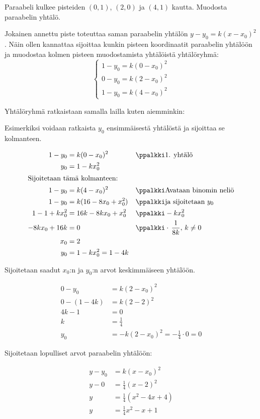 \begin{esimerkki}
	Paraabeli kulkee pisteiden $(0,1)$, $(2,0)$ ja $(4,1)$ kautta. Muodosta paraabelin yhtälö.
	
	\begin{esimratk} 
		Jokainen annettu piste toteuttaa saman paraabelin yhtälön $y - y_0 = k(x-x_0)^2$. Näin ollen kannattaa sijoittaa kunkin pisteen koordinaatit paraabelin yhtälöön ja muodostaa kolmen pisteen muodostamista yhtälöistä yhtälöryhmä:
		\[
		\left\{
		\begin{aligned}
		1 - y_0 = k(0 - x_0)^2 \\
		0 - y_0 = k(2 - x_0)^2 \\
		1 - y_0 = k(4 - x_0)^2
		\end{aligned}
		\right.
		\]

		Yhtälöryhmä ratkaistaan samalla lailla kuten aiemminkin:
		
		Esimerkiksi voidaan ratkaista $y_0$ ensimmäisestä yhtälöstä ja sijoittaa se kolmanteen.

\begin{align*}
	1 - y_0 &= k(0 - x_0)^2 &&\ppalkki \text{1. yhtälö}\\
	y_0 &= 1- kx^2_0	 \\
    \intertext{Sijoitetaan tämä kolmanteen:}
	1-y_0 &= k(4-x_0)^2 &&\ppalkki \text{Avataan binomin neliö} \\
	1-y_0 &= k(16 - 8x_0 + x_0^2) &&\ppalkki \text{ja sijoitetaan }y_0 \\
	1-1+kx^2_0 &= 16k - 8kx_0 + x^2_0 &&\ppalkki -kx^2_0 \\
	-8kx_0 + 16k &= 0 &&\ppalkki \cdot \, \frac{1}{8k}, \, k \neq 0 \\
	x_0 &= 2 \\
	y_0 &= 1- kx^2_0 = 1 - 4k	
\end{align*}	

		 Sijoitetaan saadut $x_0$:n ja $y_0$:n arvot keskimmäiseen yhtälöön.

\begin{align*}	
	0 - y_0 &= k(2 - x_0)^2 \\
	0 - (1 - 4k) &= k(2-2)^2 \\
	4k -1 &= 0 \\
	k &= \frac{1}{4} \\
	y_0 &= -k(2 - x_0)^2 = - \frac{1}{4} \cdot 0 = 0
\end{align*}

		Sijoitetaan lopulliset arvot paraabelin yhtälöön:

\begin{align*}	
    y - y_0 &= k(x-x_0)^2 \\
	y - 0 &= \frac{1}{4}(x-2)^2 \\
	y &= \frac{1}{4}(x^2-4x+4) \\
	y &= \frac{1}{4}x^2 - x + 1
\end{align*}



\end{esimratk}
\end{esimerkki}
